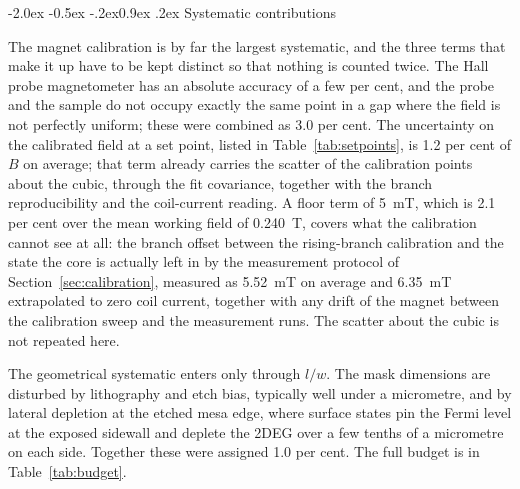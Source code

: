 \documentclass[11pt,a4paper]{article}
\makeatletter
\renewcommand\subsection{\@startsection{subsection}{2}{\z@}%
  {-2.0ex \@plus -0.5ex \@minus -.2ex}{0.9ex \@plus .2ex}%
  {\normalfont\normalsize\bfseries}}
\makeatother
\begin{document}
\subsection{Systematic contributions}

The magnet calibration is by far the largest systematic, and the three terms that make it up
have to be kept distinct so that nothing is counted twice. The Hall probe magnetometer has an
absolute accuracy of a few per cent, and the probe and the sample do not occupy exactly the
same point in a gap where the field is not perfectly uniform; these were combined as
\num{3.0} per cent. The uncertainty on the calibrated field at a set point, listed in
Table~\ref{tab:setpoints}, is \num{1.2} per cent of $B$ on average; that term already carries
the scatter of the calibration points about the cubic, through the fit covariance, together
with the branch reproducibility and the coil-current reading. A floor term of
\qty{5}{\milli\tesla}, which is \num{2.1} per cent over the mean working field of
\qty{0.240}{\tesla}, covers what the calibration cannot see at all: the branch offset between
the rising-branch calibration and the state the core is actually left in by the measurement
protocol of Section~\ref{sec:calibration}, measured as \qty{5.52}{\milli\tesla} on average and
\qty{6.35}{\milli\tesla} extrapolated to zero coil current, together with any drift of the
magnet between the calibration sweep and the measurement runs. The scatter about the cubic is not repeated
here.

The geometrical systematic enters only through $l/w$. The mask dimensions are disturbed by
lithography and etch bias, typically well under a micrometre, and by lateral depletion at the
etched mesa edge, where surface states pin the Fermi level at the exposed sidewall and
deplete the 2DEG over a few tenths of a micrometre on each side. Together these were assigned
\num{1.0} per cent. The full budget is in Table~\ref{tab:budget}.
\end{document}
